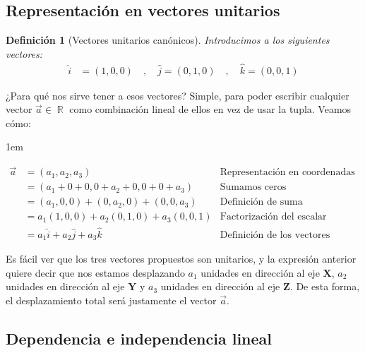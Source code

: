 \documentclass[12pt, fleqn]{report}                             %
\newenvironment{SmallIndentation}[1][0.75em]                    %
    {\begin{adjustwidth}{#1}{}\begin{footnotesize}}                 %
    {\end{footnotesize}\end{adjustwidth}}                           %
\newtheorem{Definition}{Definición}[section]                    %
\DeclareMathOperator \Reals        {\mathbb{R}}                 %
\begin{document}
            \subsection{Representación en vectores unitarios}
            
            \begin{Definition}[Vectores unitarios canónicos]
                Introducimos a los siguientes vectores:
                \begin{align}
                    \hat{i} &= (1, 0, 0) \quad , \quad \hat{j} = (0, 1, 0) \quad , \quad \hat{k} = (0, 0, 1)
                \end{align}
            \end{Definition}
        
            ¿Para qué nos sirve tener a esos vectores? Simple, para poder escribir cualquier vector $\vec{a} \in \Reals$ como combinación lineal de ellos en vez de usar la tupla. Veamos cómo:
            \begin{SmallIndentation}[1em]
                \begin{align*}
                    \vec{a} &= (a_1, a_2, a_3) &\mbox{Representación en coordenadas}\\
                    &= (a_1 + 0 + 0, 0 + a_2 + 0, 0 + 0 + a_3) &\mbox{Sumamos ceros convenientemente}\\
                    &= (a_1, 0, 0) + (0, a_2, 0) + (0, 0, a_3) &\mbox{Definición de suma}\\
                    &= a_1(1, 0, 0) + a_2(0, 1, 0) + a_3(0, 0, 1) &\mbox{Factorización del escalar}\\
                    &= \boxed{a_1\hat{i} + a_2\hat{j} + a_3\hat{k}} &\mbox{Definición de los vectores canónicos}
                \end{align*}
            \end{SmallIndentation}
        
            Es fácil ver que los tres vectores propuestos son unitarios, y la expresión anterior quiere decir que nos estamos desplazando $a_1$ unidades en dirección al eje $\mathbf{X}$, $a_2$ unidades en dirección al eje $\mathbf{Y}$ y $a_3$ unidades en dirección al eje $\mathbf{Z}$. De esta forma, el desplazamiento total será justamente el vector $\vec{a}$.
            
            \subsection{Dependencia e independencia lineal}
            
\end{document}
